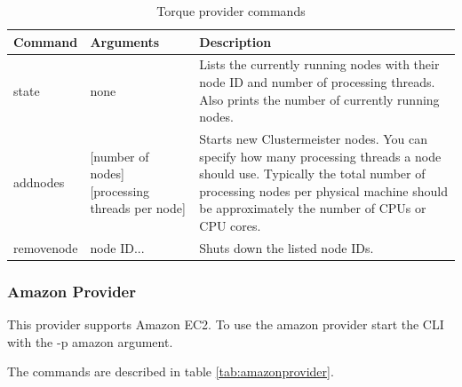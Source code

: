 \documentclass{article}
\begin{document}
\begin{table}[h]
\centering
\begin{tabular}{|l| p{3cm} | p{6cm}|}
\hline
\textbf{Command} & \textbf{Arguments} & \textbf{Description} \\ \hline
state & none & Lists the currently running nodes with their node ID and number of processing threads. Also prints the number of currently running nodes. \\ \hline
addnodes & [number of nodes] [processing threads per node] & Starts new Clustermeister nodes. You can specify how many processing threads a node should use. Typically the total number of processing nodes per physical machine should be approximately the number of CPUs or CPU cores. \\ \hline
removenode & node ID... & Shuts down the listed node IDs. \\ \hline
\end{tabular}
\caption{Torque provider commands}
\label{tab:torqueprovider}
\end{table}

\subsubsection{Amazon Provider}

This provider supports Amazon EC2. To use the amazon provider start the CLI with the -p amazon argument.

The commands are described in table \ref{tab:amazonprovider}.
\end{document}
